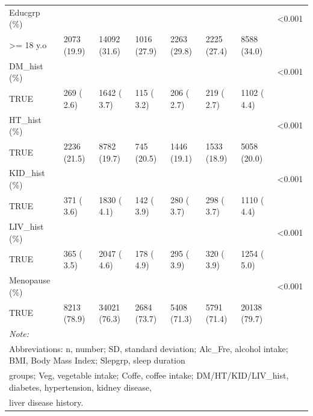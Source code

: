 \documentclass[]{tufte-handout}
\begin{document}
\begin{table}[!htbp]
\begin{tabular}[t]{llllllll}
Educgrp (\%) &  &  &  &  &  &  & <0.001\\
\rowcolor{gray!6}  \hspace{1em}>= 18 y.o & 2073 (19.9) & 14092 (31.6) & 1016 (27.9) & 2263 (29.8) & 2225 (27.4) & 8588 (34.0) & \\
DM\_hist (\%) &  &  &  &  &  &  & <0.001\\
\rowcolor{gray!6}  \hspace{1em}TRUE & 269 ( 2.6) & 1642 ( 3.7) & 115 ( 3.2) & 206 ( 2.7) & 219 ( 2.7) & 1102 ( 4.4) & \\
HT\_hist (\%) &  &  &  &  &  &  & <0.001\\
\rowcolor{gray!6}  \hspace{1em}TRUE & 2236 (21.5) & 8782 (19.7) & 745 (20.5) & 1446 (19.1) & 1533 (18.9) & 5058 (20.0) & \\
KID\_hist (\%) &  &  &  &  &  &  & <0.001\\
\rowcolor{gray!6}  \hspace{1em}TRUE & 371 ( 3.6) & 1830 ( 4.1) & 142 ( 3.9) & 280 ( 3.7) & 298 ( 3.7) & 1110 ( 4.4) & \\
LIV\_hist (\%) &  &  &  &  &  &  & <0.001\\
\rowcolor{gray!6}  \hspace{1em}TRUE & 365 ( 3.5) & 2047 ( 4.6) & 178 ( 4.9) & 295 ( 3.9) & 320 ( 3.9) & 1254 ( 5.0) & \\
Menopause (\%) &  &  &  &  &  &  & <0.001\\
\rowcolor{gray!6}  \hspace{1em}TRUE & 8213 (78.9) & 34021 (76.3) & 2684 (73.7) & 5408 (71.3) & 5791 (71.4) & 20138 (79.7) & \\
\bottomrule
\multicolumn{8}{l}{\textit{Note: }}\\
\multicolumn{8}{l}{Abbreviations: n, number; SD, standard deviation; Alc\_Fre, alcohol intake; BMI, Body Mass Index; Slepgrp, sleep duration}\\
\multicolumn{8}{l}{groups; Veg, vegetable intake; Coffe, coffee intake; DM/HT/KID/LIV\_hist, diabetes, hypertension, kidney disease,}\\
\multicolumn{8}{l}{liver disease history.}\\
\end{tabular}
\end{table}
\end{document}
